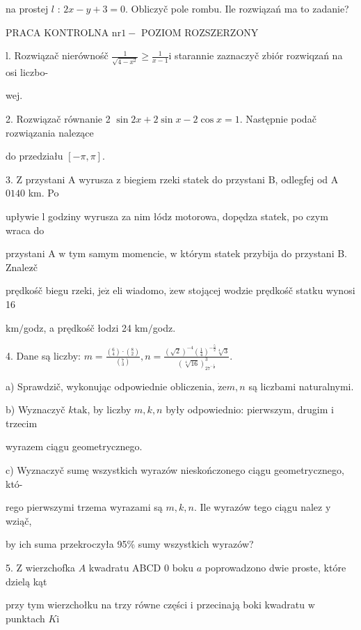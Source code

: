 \documentclass[a4paper,12pt]{article}
\begin{document}
na prostej $l$ : $2x-y+3=0$. Obliczyč pole rombu. Ile rozwiązań ma to zadanie?




PRACA KONTROLNA $\mathrm{n}\mathrm{r}1-$ POZIOM ROZSZERZONY

l. Rozwiązač nierównośč $\displaystyle \frac{1}{\sqrt{4-x^{2}}}\geq\frac{1}{x-1}\mathrm{i}$ starannie zaznaczyč zbiór rozwiqzań na osi liczbo-

wej.

2. Rozwiązač równanie 2 $\sin 2x+2\sin x-2\cos x=1$. Następnie podač rozwiązania nalezące

do przedziału $[-\pi,\pi].$

3. $\mathrm{Z}$ przystani A wyrusza $\mathrm{z}$ biegiem rzeki statek do przystani $\mathrm{B}$, odlegfej od A $0140$ km. Po

upływie l godziny wyrusza za nim łódz$\acute{}$ motorowa, dopędza statek, po czym wraca do

przystani A $\mathrm{w}$ tym samym momencie, $\mathrm{w}$ którym statek przybija do przystani B. Znalez$\acute{}$č

prędkośč biegu rzeki, $\mathrm{j}\mathrm{e}\dot{\mathrm{z}}$ eli wiadomo, $\dot{\mathrm{z}}\mathrm{e}\mathrm{w}$ stojącej wodzie prędkośč statku wynosi 16

$\mathrm{k}\mathrm{m}/$godz, a prędkośč łodzi 24 $\mathrm{k}\mathrm{m}/$godz.

4. Dane są liczby: $m=\displaystyle \frac{(_{4}^{6})\cdot(_{2}^{8})}{(_{3}^{7})}, n=\displaystyle \frac{(\sqrt{2})^{-4}(\frac{1}{4})^{-\frac{5}{2}}\sqrt[4]{3}}{(\sqrt[4]{16})_{27^{-\frac{1}{4}}}^{3}}.$

a) Sprawdzič, wykonując odpowiednie obliczenia, $\dot{\mathrm{z}}\mathrm{e}m, n$ są liczbami naturalnymi.

b) Wyznaczyč $k\mathrm{t}\mathrm{a}\mathrm{k}$, by liczby $m, k, n$ były odpowiednio: pierwszym, drugim $\mathrm{i}$ trzecim

wyrazem ciągu geometrycznego.

c) Wyznaczyč sumę wszystkich wyrazów nieskończonego ciągu geometrycznego, któ-

rego pierwszymi trzema wyrazami są $m, k, n$. Ile wyrazów tego ciągu nalez $\mathrm{y}$ wziąč,

by ich suma przekroczyła 95\% sumy wszystkich wyrazów?

5. $\mathrm{Z}$ wierzchofka $A$ kwadratu ABCD $0$ boku $a$ poprowadzono dwie proste, które dzielą kąt

przy tym wierzchołku na trzy równe części $\mathrm{i}$ przecinają boki kwadratu $\mathrm{w}$ punktach $K\mathrm{i}$
\end{document}
